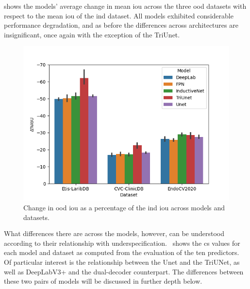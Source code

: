  shows the models' average change in mean \gls{iou} across the three \gls{ood} datasets with respect to the mean \gls{iou} of the \gls{ind} dataset. All models exhibited considerable performance degradation, and as before the differences across architectures are insignificant, once again with the exception of the TriUnet. 
    \begin{figure}[htb]
        \centering
        \includegraphics[width=\linewidth]{illustrations/delta_iou_baseline.png}
        \caption{Change in \gls{ood} \gls{iou} as a percentage of the \gls{ind} \gls{iou} across models and datasets.}
        \label{fig:baseline_ious}
    \end{figure}

    What differences there are across the models, however, can be understood according to their relationship with underspecification.~ shows the \gls{cs} values for each model and dataset as computed from the evaluation of the ten predictors. Of particular interest is the relationship between the Unet and the TriUNet, as well as DeepLabV3+ and the dual-decoder counterpart. The differences between these two pairs of models will be discussed in further depth below.
    
